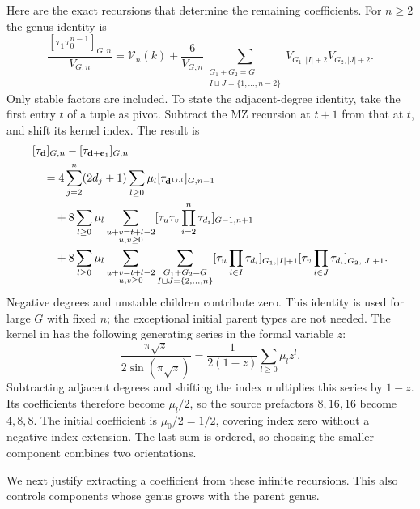 Here are the exact recursions that determine the remaining coefficients.
For $n\geq2$ the genus identity is
\begin{equation}\label{eq:a:exact-genus}
 \frac{[\tau_1\tau_0^{n-1}]_{G,n}}{V_{G,n}}
 =\mathcal V_n(k)+\frac6{V_{G,n}}
 \sum_{\substack{G_1+G_2=G\\I\sqcup J=\{1,\ldots,n-2\}}}
        V_{G_1,|I|+2}V_{G_2,|J|+2}.
\end{equation}
Only stable factors are included. To state the adjacent-degree identity,
take the first entry $t$ of a tuple as pivot. Subtract the MZ recursion
at $t+1$ from that at $t$, and shift its kernel index. The result is
\begin{align}
 &[\tau_{\mathbf d}]_{G,n}
       -[\tau_{\mathbf d+\mathbf e_1}]_{G,n}\notag\\
 &\quad=4\sum_{j=2}^n(2d_j+1)\sum_{l\geq0}\mu_l
                            [\tau_{\mathbf d^{1j,l}}]_{G,n-1}\notag\\
 &\qquad+8\sum_{l\geq0}\mu_l
       \sum_{\substack{u+v=t+l-2\\u,v\geq0}}
                   [\tau_u\tau_v\prod_{i=2}^n\tau_{d_i}]_{G-1,n+1}\notag\\
 &\qquad+8\sum_{l\geq0}\mu_l
       \sum_{\substack{u+v=t+l-2\\u,v\geq0}}
       \sum_{\substack{G_1+G_2=G\\I\sqcup J=\{2,\ldots,n\}}}
       [\tau_u\prod_{i\in I}\tau_{d_i}]_{G_1,|I|+1}
       [\tau_v\prod_{i\in J}\tau_{d_i}]_{G_2,|J|+1}.
 \label{eq:a:exact-adjacent}
\end{align}
Negative degrees and unstable children contribute zero. This identity
is used for large $G$ with fixed $n$; the exceptional initial parent
types are not needed. The kernel in \cite[(4.4)--(4.7)]{HMT25} has
the following generating series in the formal variable $z$:
\[
 \frac{\pi\sqrt z}{2\sin(\pi\sqrt z)}
   =\frac1{2(1-z)}\sum_{l\geq0}\mu_l z^l.
\]
Subtracting adjacent degrees and shifting the index multiplies this
series by $1-z$. Its coefficients therefore become $\mu_l/2$, so
the source prefactors $8,16,16$ become $4,8,8$. The initial coefficient
is $\mu_0/2=1/2$, covering index zero without a negative-index
extension. The last sum is ordered, so choosing the smaller component
combines two orientations.

We next justify extracting a coefficient from these infinite recursions.
This also controls components whose genus grows with the parent genus.

